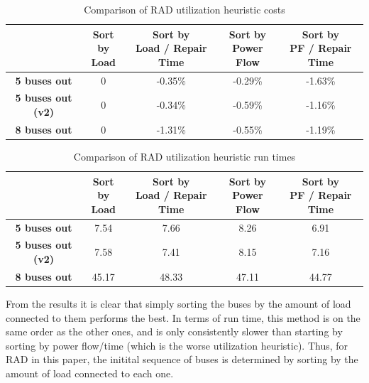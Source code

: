\documentclass[12pt]{article}
\begin{document}
\begin{table}[ht]
    \centering
    \begin{tabular}{|c|c|c|c|c|}
        \hline
        & \makecell{Sort by \\ Load} 
        & \makecell{Sort by \\ Load / Repair Time} 
        & \makecell{Sort by \\ Power Flow} 
        & \makecell{Sort by \\ PF / Repair Time} \\
        \hline
        \textbf{5 buses out} & 0 & -0.35\% & -0.29\% & -1.63\% \\
        \hline
        \textbf{5 buses out (v2)} & 0 & -0.34\% & -0.59\% & -1.16\% \\
        \hline
        \textbf{8 buses out} & 0 & -1.31\% & -0.55\% & -1.19\% \\
        \hline
    \end{tabular}
    \caption{Comparison of RAD utilization heuristic costs}
    \label{tab:rad_results}
\end{table}

\begin{table}[ht]
    \centering
    \renewcommand{\arraystretch}{1.2} %
    \begin{tabular}{|c|c|c|c|c|}
        \hline
        & \makecell{Sort by \\ Load} 
        & \makecell{Sort by \\ Load / Repair Time} 
        & \makecell{Sort by \\ Power Flow} 
        & \makecell{Sort by \\ PF / Repair Time} \\
        \hline
        \textbf{5 buses out} & 7.54 & 7.66 & 8.26 & 6.91 \\
        \hline
        \textbf{5 buses out (v2)} & 7.58 & 7.41 & 8.15 & 7.16 \\
        \hline
        \textbf{8 buses out} & 45.17 & 48.33 & 47.11 & 44.77 \\
        \hline
    \end{tabular}
    \caption{Comparison of RAD utilization heuristic run times}
    \label{tab:rad_times}
\end{table}

From the results it is clear that simply sorting the buses by the amount of load connected to them performs the best. In terms of run time, this method is on the same order as the other ones, and is only consistently slower than starting by sorting by power flow/time (which is the worse utilization heuristic). Thus, for RAD in this paper, the initital sequence of buses is determined by sorting by the amount of load connected to each one.
\end{document}
